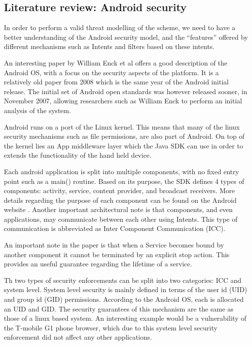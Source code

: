 \subsection{Literature review: Android security}
In order to perform a valid threat modelling of the scheme, we need to have a better understanding of the Android security model, and the ``features'' offered by different mechanisms such as Intents and filters based on these intents.

An interesting paper by William Enck et al \cite{enck2009understanding} offers a good description of the Android OS, with a focus on the security aspects of the platform. It is a relatively old paper from 2008 which is the same year of the Android initial release. The initial set of Android open standards was however released sooner, in November 2007, allowing researchers such as William Enck to perform an initial analysis of the system.

Android runs on a port of the Linux kernel. This means that many of the linux security mechanisms such as file permissions, are also part of Android. On top of the kernel lies an App middleware layer which the Java SDK can use in order to extends the functionality of the hand held device.

Each android application is split into multiple components, with no fixed entry point such as a main() routine. Based on its purpose, the SDK defines 4 types of components: activity, service, content provider, and broadcast receivers. More details regarding the purpose of each component can be found on the Android website \cite{liebergeld2013android}. Another important architectural note is that components, and even applications, may communicate between each other using Intents. This type of communication is abbreviated as Inter Component Communication (ICC).

An important note in the paper is that when a Service becomes bound by another component it cannot be terminated by an explicit stop action. This provides an useful guarantee regarding the lifetime of a service. 

Th two types of security enforcements can be split into two categories: ICC and system level. System level security is mainly defined in terms of the user id (UID) and group id (GID) permissions. According to the Android OS, each is allocated an UID and GID. The security guarantees of this mechanism are the same as those of a linux based system. An interesting example would be a vulnerability of the  T-mobile G1 phone browser, which due to this system level security enforcement did not affect any other applications.

